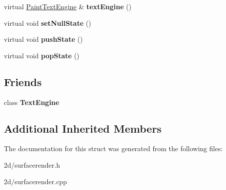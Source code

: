 \begin{DoxyCompactItemize}
\item 
\hypertarget{struct_tempest_1_1_surface_render_1_1_paint_dev_a200934546a413d56f4ddc5ba7bb2fc95}{virtual \hyperlink{class_tempest_1_1_paint_text_engine}{Paint\+Text\+Engine} \& {\bfseries text\+Engine} ()}\label{struct_tempest_1_1_surface_render_1_1_paint_dev_a200934546a413d56f4ddc5ba7bb2fc95}

\item 
\hypertarget{struct_tempest_1_1_surface_render_1_1_paint_dev_aadcad1f78a53e6b9da23eb316b735c23}{virtual void {\bfseries set\+Null\+State} ()}\label{struct_tempest_1_1_surface_render_1_1_paint_dev_aadcad1f78a53e6b9da23eb316b735c23}

\item 
\hypertarget{struct_tempest_1_1_surface_render_1_1_paint_dev_ac8c7aa45f0b49458b3398f4baf25204e}{virtual void {\bfseries push\+State} ()}\label{struct_tempest_1_1_surface_render_1_1_paint_dev_ac8c7aa45f0b49458b3398f4baf25204e}

\item 
\hypertarget{struct_tempest_1_1_surface_render_1_1_paint_dev_a2cd5ac300b4bcac120e1fd1634c0363e}{virtual void {\bfseries pop\+State} ()}\label{struct_tempest_1_1_surface_render_1_1_paint_dev_a2cd5ac300b4bcac120e1fd1634c0363e}

\end{DoxyCompactItemize}
\subsection*{Friends}
\begin{DoxyCompactItemize}
\item 
\hypertarget{struct_tempest_1_1_surface_render_1_1_paint_dev_aaa3362b49a2e45bc5abd06dc9d9ba0fa}{class {\bfseries Text\+Engine}}\label{struct_tempest_1_1_surface_render_1_1_paint_dev_aaa3362b49a2e45bc5abd06dc9d9ba0fa}

\end{DoxyCompactItemize}
\subsection*{Additional Inherited Members}


The documentation for this struct was generated from the following files\+:\begin{DoxyCompactItemize}
\item 
2d/surfacerender.\+h\item 
2d/surfacerender.\+cpp\end{DoxyCompactItemize}
